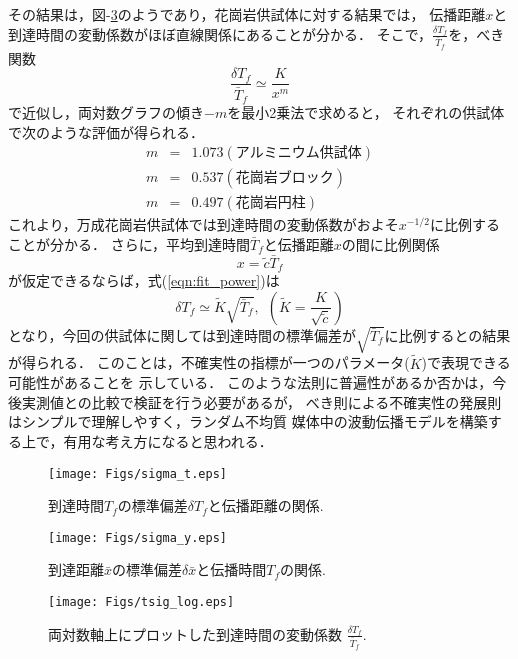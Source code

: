 その結果は，図-\ref{fig:fig17}のようであり，花崗岩供試体に対する結果では，
伝播距離$x$と到達時間の変動係数がほぼ直線関係にあることが分かる．
そこで，$\frac{\delta T_f}{\bar{T}_f}$を，べき関数
\begin{equation}
	\frac{\delta T_f }{\bar{T}_f} \simeq \frac{K}{x^m}
	\label{eqn:fit_power}
\end{equation}
で近似し，両対数グラフの傾き$-m$を最小2乗法で求めると，
それぞれの供試体で次のような評価が得られる．
\begin{eqnarray}
	m &=& 1.073 (アルミニウム供試体) \\
	m &=& 0.537 (花崗岩ブロック)\\
	m &=& 0.497 (花崗岩円柱)
\end{eqnarray}
これより，万成花崗岩供試体では到達時間の変動係数がおよそ$x^{-1/2}$に比例することが分かる．
さらに，平均到達時間$\bar T_f$と伝播距離$x$の間に比例関係
\begin{equation}
	x=\tilde c \bar T_f
	\label{linfit_x}
\end{equation}
が仮定できるならば，式(\ref{eqn:fit_power})は
\begin{equation}
	\delta T_f \simeq \tilde K \sqrt{ \bar{T}_f}, \  \ 
	\left( \tilde K=\frac{K}{\sqrt{\tilde c}}\right)
	\label{eqn:plaw} 
\end{equation}
となり，今回の供試体に関しては到達時間の標準偏差が$\sqrt{\bar{T}_f}$に比例するとの結果が得られる．
このことは，不確実性の指標が一つのパラメータ($\tilde K$)で表現できる可能性があることを
示している．
このような法則に普遍性があるか否かは，今後実測値との比較で検証を行う必要があるが，
べき則による不確実性の発展則はシンプルで理解しやすく，ランダム不均質
媒体中の波動伝播モデルを構築する上で，有用な考え方になると思われる．
\begin{figure}
\begin{center}
	\texttt{[image: Figs/sigma\_t.eps]}
	\vspace{-2mm}
	\caption{到達時間$T_f$の標準偏差$\delta T_f$と伝播距離の関係. }
	\label{fig:fig15}
\end{center}
	\vspace{-5mm}
\end{figure}
\begin{figure}
\begin{center}
	\texttt{[image: Figs/sigma\_y.eps]}
	\vspace{-2mm}
	\caption{到達距離$\bar{x}$の標準偏差$\delta \bar{x}$と伝播時間$T_f$の関係. }
	\label{fig:fig16}
\end{center}
	\vspace{-5mm}
\end{figure}
\begin{figure}
\begin{center}
	\texttt{[image: Figs/tsig\_log.eps]}
	\vspace{-2mm}
	\caption{
		両対数軸上にプロットした到達時間の変動係数
			$\frac{\delta T_f}{\bar{T}_f}$. 
		}
	\label{fig:fig17}
\end{center}
	\vspace{-8mm}
\end{figure}
